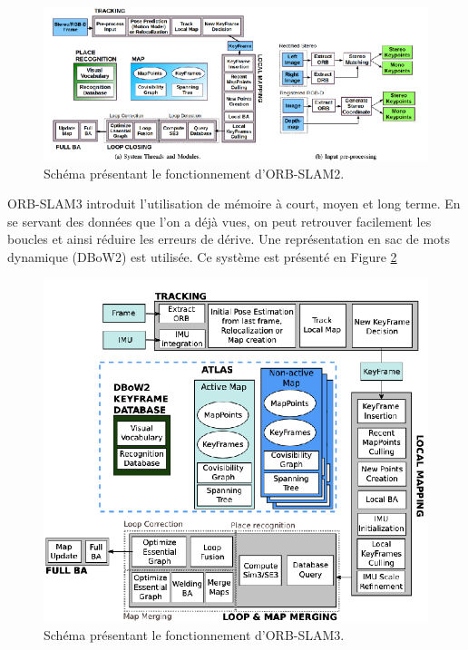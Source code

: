 \documentclass[11pt]{article}
\begin{document}
          \begin{figure}[hbt]  
            \includegraphics[width=\textwidth]{ORB_SLAM2.png}    
            \caption{Schéma présentant le fonctionnement d'ORB-SLAM2.}
            \label{fig:ORBSLAM2}
          \end{figure} 

          ORB-SLAM3 introduit l'utilisation de mémoire à court, moyen et long terme.
          En se servant des données que l'on a déjà vues, on peut retrouver
          facilement les boucles et ainsi réduire les erreurs de dérive. Une représentation en sac de mots dynamique (DBoW2) est utilisée.
          Ce système est présenté en Figure \ref{fig:ORBSLAM3}

          \begin{figure}[hbt]  
            \includegraphics[width=\textwidth]{ORB_SLAM3.png}    
            \caption{Schéma présentant le fonctionnement d'ORB-SLAM3.}
            \label{fig:ORBSLAM3}
          \end{figure}           
\end{document}
